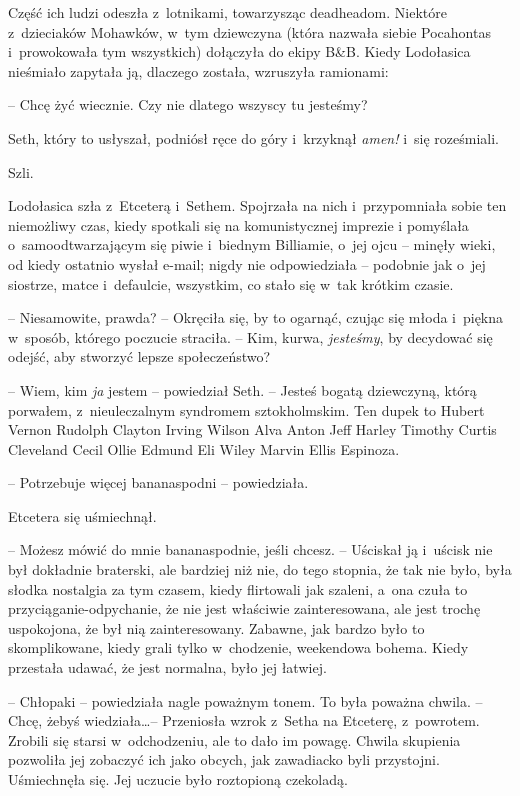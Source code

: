 \documentclass[oneside,polish,11pt,sfheadings]{mwbk}
\begin{document}
Część ich ludzi odeszła z~lotnikami, towarzysząc deadheadom. Niektóre z~dzieciaków Mohawków, w~tym dziewczyna (która nazwała siebie Pocahontas i~prowokowała tym wszystkich) dołączyła do ekipy B\&B. Kiedy Lodołasica
nieśmiało zapytała ją, dlaczego została, wzruszyła ramionami: 

-- Chcę żyć
wiecznie. Czy nie dlatego wszyscy tu jesteśmy?

Seth, który to usłyszał, podniósł ręce do góry i~krzyknął \textit{amen!} i~się roześmiali.

Szli.

Lodołasica szła z~Etceterą i~Sethem. Spojrzała na nich i~przypomniała
sobie ten niemożliwy czas, kiedy spotkali się na komunistycznej imprezie
i pomyślała o~samoodtwarzającym się piwie i~biednym Billiamie, o~jej
ojcu -- minęły wieki, od kiedy ostatnio wysłał e-mail; nigdy nie
odpowiedziała -- podobnie jak o~jej siostrze, matce i~defaulcie,
wszystkim, co stało się w~tak krótkim czasie.

-- Niesamowite, prawda? -- Okręciła się, by to ogarnąć, czując się młoda i~piękna w~sposób, którego poczucie straciła. -- Kim, kurwa,
\textit{jesteśmy}, by decydować się odejść, aby stworzyć lepsze
społeczeństwo?

-- Wiem, kim \textit{ja} jestem -- powiedział Seth. -- Jesteś bogatą
dziewczyną, którą porwałem, z~nieuleczalnym syndromem sztokholmskim. Ten
dupek to Hubert Vernon Rudolph Clayton Irving Wilson Alva Anton Jeff
Harley Timothy Curtis Cleveland Cecil Ollie Edmund Eli Wiley Marvin
Ellis Espinoza.

-- Potrzebuje więcej bananaspodni -- powiedziała.

Etcetera się uśmiechnął. 

-- Możesz mówić do mnie bananaspodnie, jeśli
chcesz. -- Uściskał ją i~uścisk nie był dokładnie braterski, ale bardziej
niż nie, do tego stopnia, że tak nie było, była słodka nostalgia za tym
czasem, kiedy flirtowali jak szaleni, a~ona czuła to
przyciąganie-odpychanie, że nie jest właściwie zainteresowana, ale jest
trochę uspokojona, że był nią zainteresowany. Zabawne, jak bardzo było
to skomplikowane, kiedy grali tylko w~chodzenie, weekendowa bohema.
Kiedy przestała udawać, że jest normalna, było jej łatwiej.

-- Chłopaki -- powiedziała nagle poważnym tonem. To była poważna chwila. -- Chcę, żebyś wiedziała\ldots  -- Przeniosła wzrok z~Setha na Etceterę, z~powrotem. Zrobili się starsi w~odchodzeniu, ale to dało im powagę.
Chwila skupienia pozwoliła jej zobaczyć ich jako obcych, jak zawadiacko
byli przystojni. Uśmiechnęła się. Jej uczucie było roztopioną czekoladą.
\end{document}
